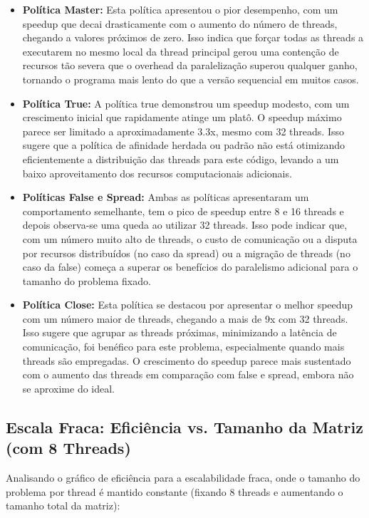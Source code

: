 \documentclass[a4paper, 12pt]{article}
\begin{document}
	\begin{itemize}
		\item \textbf{Política Master:} Esta política apresentou o pior desempenho, com um speedup que decai drasticamente com o aumento do número de threads, chegando a valores próximos de zero. Isso indica que forçar todas as threads a executarem no mesmo local da thread principal gerou uma contenção de recursos tão severa que o overhead da paralelização superou qualquer ganho, tornando o programa mais lento do que a versão sequencial em muitos casos. 
		
		\item \textbf{Política True:} A política true demonstrou um speedup modesto, com um crescimento inicial que rapidamente atinge um platô. O speedup máximo parece ser limitado a aproximadamente 3.3x, mesmo com 32 threads. Isso sugere que a política de afinidade herdada ou padrão não está otimizando eficientemente a distribuição das threads para este código, levando a um baixo aproveitamento dos recursos computacionais adicionais.
		
		\item \textbf{Políticas False e Spread:} Ambas as políticas apresentaram um comportamento semelhante, tem o pico de speedup entre 8 e 16 threads e depois observa-se uma queda ao utilizar 32 threads. Isso pode indicar que, com um número muito alto de threads, o custo de comunicação ou a disputa por recursos distribuídos (no caso da spread) ou a migração de threads (no caso da false) começa a superar os benefícios do paralelismo adicional para o tamanho do problema fixado.
		
		\item \textbf{Política Close:} Esta política se destacou por apresentar o melhor speedup com um número maior de threads, chegando a mais de 9x com 32 threads. Isso sugere que agrupar as threads próximas, minimizando a latência de comunicação, foi benéfico para este problema, especialmente quando mais threads são empregadas. O crescimento do speedup parece mais sustentado com o aumento das threads em comparação com false e spread, embora não se aproxime do ideal.
		
	\end{itemize}
	
	\subsection{Escala Fraca: Eficiência vs. Tamanho da Matriz (com 8 Threads)}
	\hspace{0.62cm}Analisando o gráfico de eficiência para a escalabilidade fraca, onde o tamanho do problema por thread é mantido constante (fixando 8 threads e aumentando o tamanho total da matriz):
	
\end{document}
